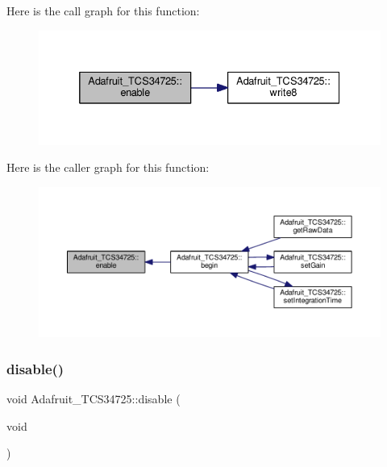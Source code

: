 Here is the call graph for this function\+:
\nopagebreak
\begin{figure}[H]
\begin{center}
\leavevmode
\includegraphics[width=332pt]{df/d54/class_adafruit___t_c_s34725_ad9a0e1f4f77d32dc0a6d604f7d1d5586_cgraph}
\end{center}
\end{figure}
Here is the caller graph for this function\+:
\nopagebreak
\begin{figure}[H]
\begin{center}
\leavevmode
\includegraphics[width=350pt]{df/d54/class_adafruit___t_c_s34725_ad9a0e1f4f77d32dc0a6d604f7d1d5586_icgraph}
\end{center}
\end{figure}
\mbox{\label{class_adafruit___t_c_s34725_a79ac9b01a540f132d4bbf2edd2d6e8a2}} 
\subsubsection{\texorpdfstring{disable()}{disable()}}
{\footnotesize\ttfamily void Adafruit\+\_\+\+T\+C\+S34725\+::disable (\begin{DoxyParamCaption}\item[{void}]{ }\end{DoxyParamCaption})\hspace{0.3cm}{\ttfamily [private]}}

